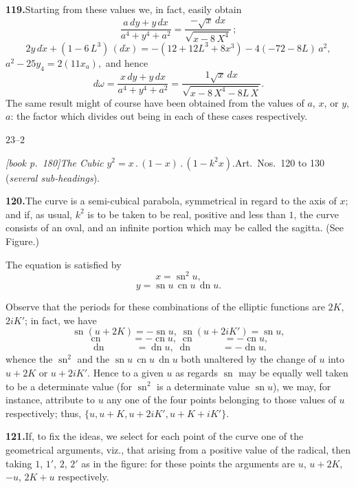 \documentclass[11pt,a4paper]{article}
\DeclareMathOperator{\sn}{sn}
\DeclareMathOperator{\cn}{cn}
\DeclareMathOperator{\dn}{dn}
\begin{document}
\medskip\noindent\textbf{119.}\quad Starting from these values we, in fact, easily obtain
\[
\frac{a\,dy + y\,dx}{a^4 + y^4 + a^2} = \frac{-\sqrt{x}\,dx}{\sqrt{x - 8\,X^4}}\,;
\]
\[
2y\,d\dot{x} + (1 - 6\,L^3)\,(d\dot{x}) = -(12 + 12L^3 + 8x^3) - 4(-72 - 8L)\,a^2,
\]
$a^2 - 25 y_4 = 2(11x_a),$
and hence
\[
d\omega = \frac{x\,dy + y\,dx}{a^4 + y^4 + a^2} = \frac{1\sqrt{x}\,dx}{\sqrt{x - 8\,X^4 - 8L\,X}}.
\]
The same result might of course have been obtained from the values of $a$, $x$, or $y$, $a$: the factor which divides out being in each of these cases respectively.

\hfill $23$--$2$

\medskip\noindent\textit{[book p.~180]}\quad \textit{The Cubic} $y^2 = x\,.\,(1 - x)\,.\,(1 - k^2 x)$.\quad Art.\ Nos.\ 120 to 130 (\textit{several sub-headings}).

\medskip\noindent\textbf{120.}\quad The curve is a semi-cubical parabola, symmetrical in regard to the axis of $x$; and if, as usual, $k^2$ is to be taken to be real, positive and less than $1$, the curve consists of an oval, and an infinite portion which may be called the sagitta. (See Figure.)

The equation is satisfied by
\[
x = \sn^2 u,
\]
\[
y = \sn u\,\cn u\,\dn u.
\]

Observe that the periods for these combinations of the elliptic functions are $2K$, $2iK'$; in fact, we have
\[
\sn(u + 2K) = -\sn u,\;\sn(u + 2iK') = \sn u,
\]
\[
\cn\;\;\;\,\;\;\,\;\;\,\;\;= -\cn u,\;\cn\;\;\;\,\;\;\,\;\;\,\;\;= -\cn u,
\]
\[
\dn\;\;\;\,\;\;\,\;\;\,\;\;= \dn u,\;\dn\;\;\;\,\;\;\,\;\;\,\;\;= -\dn u.
\]
whence the $\sn^2$ and the $\sn u\,\cn u\,\dn u$ both unaltered by the change of $u$ into $u + 2K$ or $u + 2iK'$. Hence to a given $u$ as regards $\sn$ may be equally well taken to be a determinate value (for $\sn^2$ is a determinate value $\sn u$), we may, for instance, attribute to $u$ any one of the four points belonging to those values of $u$ respectively; thus, $\{u, u + K, u + 2iK', u + K + iK'\}$.

\medskip\noindent\textbf{121.}\quad If, to fix the ideas, we select for each point of the curve one of the geometrical arguments, viz., that arising from a positive value of the radical, then taking $1$, $1'$, $2$, $2'$ as in the figure: for these points the arguments are $u$, $u + 2K$, $-u$, $2K + u$ respectively.
\end{document}
